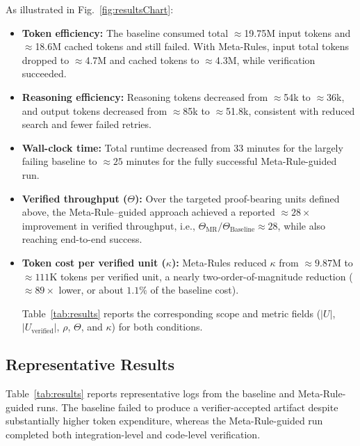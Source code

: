 \documentclass[conference]{IEEEtran}
\begin{document}
As illustrated in Fig.~\ref{fig:resultsChart}:
\begin{itemize}
    \item \textbf{Token efficiency:} The baseline consumed total $\approx$19.75M input tokens and $\approx$18.6M cached tokens and still failed. With Meta-Rules, input total tokens dropped to $\approx$4.7M and cached tokens to $\approx$4.3M, while verification succeeded.
    
    \item \textbf{Reasoning efficiency:} Reasoning tokens decreased from $\approx$54k to $\approx$36k, and output tokens decreased from $\approx$85k to $\approx$51.8k, consistent with reduced search and fewer failed retries.

    \item \textbf{Wall-clock time:} Total runtime decreased from 33 minutes for the largely failing baseline to $\approx 25$ minutes for the fully successful Meta-Rule-guided run.
    
    \item \textbf{Verified throughput ($\Theta$):} Over the targeted proof-bearing units defined above, the Meta-Rule--guided approach achieved a reported $\approx 28\times$ improvement in verified throughput, i.e., $\Theta_{\mathrm{MR}} / \Theta_{\mathrm{Baseline}} \approx 28$, while also reaching end-to-end success. 
    
    \item \textbf{Token cost per verified unit ($\kappa$):} Meta-Rules reduced $\kappa$ from $\approx 9.87$M to $\approx 111$K tokens per verified unit, a nearly two-order-of-magnitude reduction ($\approx 89\times$ lower, or about $1.1\%$ of the baseline cost).
    
    Table~\ref{tab:results} reports the corresponding scope and metric fields ($|U|$, $|U_{\mathrm{verified}}|$, $\rho$, $\Theta$, and $\kappa$) for both conditions.%
\end{itemize}
\subsection{Representative Results}
Table~\ref{tab:results} reports representative logs from the baseline and Meta-Rule-guided runs. The baseline failed to produce a verifier-accepted artifact despite substantially higher token expenditure, whereas the Meta-Rule-guided run completed both integration-level and code-level verification.
\end{document}

